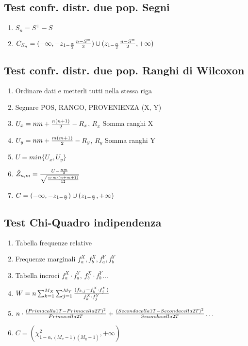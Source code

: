 \documentclass[12pt]{article}
\begin{document}
    \subsection{Test confr. distr. due pop. Segni}
    \begin{enumerate}
        \item $S_n = S^{+} - S^{-}$
        \item $C_{S_n} = (-\infty, -z_{1-{\alpha \over 2}} {{n-S^{=}}\over 2}) \cup (z_{1-{\alpha \over 2}}{{n-S^{=}}\over 2}, +\infty)$
    \end{enumerate}
    \newpage
    \subsection{Test confr. distr. due pop. Ranghi di Wilcoxon}
    \begin{enumerate}
        \item Ordinare dati e metterli tutti nella stessa riga
        \item Segnare POS, RANGO, PROVENIENZA (X, Y)
        \item $U_x = nm + {{n(n+1)}\over 2} - R_x$, $R_x$ Somma ranghi X
        \item $U_y = nm + {{m(m+1)}\over 2} - R_y$, $R_y$ Somma ranghi Y
        \item $U = min\{U_x, U_y\}$
        \item $\hat{Z}_{n, m} = {{U - {nm \over 2}}\over \sqrt{{n \cdot m \cdot (n+m+1)} \over 12 }}$
        \item $C = (-\infty, -z_{1-{\alpha \over 2}}) \cup (z_{1-{\alpha \over 2}}, +\infty)$
    \end{enumerate}
    \subsection{Test Chi-Quadro indipendenza}
    \begin{enumerate}
        \item Tabella frequenze relative
        \item Frequenze marginali $f^X_a, f^X_b, f^Y_a, f^Y_b$
        \item Tabella incroci $f^X_a \cdot f^Y_a$, $f^X_b \cdot f^Y_b$...
        \item $W = n \sum_{k=1}^{M_X} \sum_{j=1}^{M_Y} {{(f_{k,j} - f_k^X \cdot f_j^Y)} \over f_k^X \cdot f_j^Y}$
        \item $n \cdot {(Prima cella 1T - Prima cella 2T)^2 \over Prima cella 2T} + {(Seconda cella 1T - Seconda cella 2T)^2 \over Seconda cella 2T} \dots$
        \item $C = (\chi^2_{1-\alpha, (M_x - 1)(M_y - 1)}, +\infty)$
    \end{enumerate}
\end{document}
